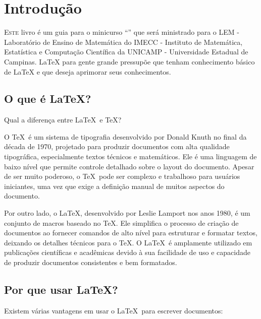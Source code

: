 \chapter{Introdução}

\lettrine{E}{ste} livro é um guia para o minicurso ``\booktitle'' que será ministrado para o LEM - Laboratório de Ensino de Matemática do IMECC - Instituto de Matemática, Estatística e Computação Científica da UNICAMP - Universidade Estadual de Campinas. LaTeX para gente grande pressupõe que tenham conhecimento básico de LaTeX e que deseja aprimorar seus conhecimentos.


\section{O que é \LaTeX?}

Qual a diferença entre \LaTeX\ e \TeX?

O \TeX\ é um sistema de tipografia desenvolvido por Donald Knuth no final da década de 1970, projetado para produzir documentos com alta qualidade tipográfica, especialmente textos técnicos e matemáticos. Ele é uma linguagem de baixo nível que permite controle detalhado sobre o layout do documento. Apesar de ser muito poderoso, o \TeX\ pode ser complexo e trabalhoso para usuários iniciantes, uma vez que exige a definição manual de muitos aspectos do documento.

Por outro lado, o \LaTeX, desenvolvido por Leslie Lamport nos anos 1980, é um conjunto de macros baseado no \TeX. Ele simplifica o processo de criação de documentos ao fornecer comandos de alto nível para estruturar e formatar textos, deixando os detalhes técnicos para o \TeX. O \LaTeX\ é amplamente utilizado em publicações científicas e acadêmicas devido à sua facilidade de uso e capacidade de produzir documentos consistentes e bem formatados.

\section{Por que usar \LaTeX?}

Existem várias vantagens em usar o \LaTeX\ para escrever documentos:

